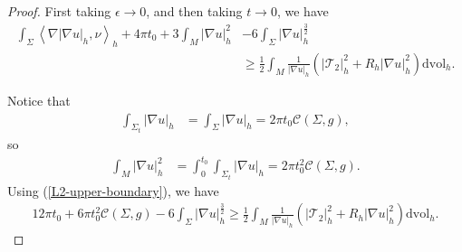 \documentclass[letter]{amsart}
\theoremstyle{definition}
\theoremstyle{remark}
\begin{document}
\begin{proof}

First taking $\epsilon \to 0$, and then taking $t\to 0$, we have
\begin{align*}
	\int_{\Sigma} \left<\nabla |\nabla u|_h , \nu  \right>_h + 4 \pi t_0 + 3 \int_M |\nabla u|_h^2 & -  6 \int_{\Sigma } |\nabla u|_h^{\frac{3}{2}}\\
	&\geq \frac{1}{2} \int_{M} \frac{1}{|\nabla u|_h}\left( |\mathcal{T}_2|_h^2 + R_h |\nabla u|_h^2 \right) \mathrm{dvol}_h.
\end{align*}

Notice that
\begin{align*}
	\int_{\Sigma _t}|\nabla u|_h &= \int_{\Sigma } |\nabla u|_h = 2 \pi t_0 \mathcal{C}(\Sigma ,g),
				     \end{align*}
so
\begin{align*}
	\int_{M} |\nabla u|_h^2 &= \int_0^{t_0} \int_{\Sigma _t} |\nabla u|_h 
				= 2 \pi t_0^2 \mathcal{C}(\Sigma ,g).
\end{align*}
Using (\ref{L2-upper-boundary}), we have
\begin{align*}
	12 \pi t_0 + 6 \pi t_0^2 \mathcal{C}(\Sigma ,g) - 6 \int_{\Sigma } |\nabla u|_h^{\frac{3}{2}} \geq \frac{1}{2} \int_{M} \frac{1}{|\nabla u|_h}\left( |\mathcal{T}_2|_h^2 + R_h |\nabla u|_h^2 \right) \mathrm{dvol}_h.
\end{align*}


\end{proof}
\end{document}
